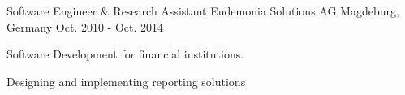 \begin{cventries}
\cventry
    {Software Engineer \& Research Assistant} %
    {Eudemonia Solutions AG} %
    {Magdeburg, Germany} %
    {Oct. 2010 - Oct. 2014} %
    {
      \begin{cvitems} %
        \item{Software Development for financial institutions.}
        \item{Designing and implementing reporting solutions}
      \end{cvitems}
    }

\end{cventries}

